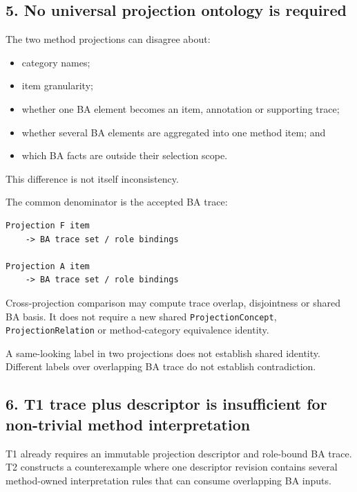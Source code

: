 \documentclass[11pt,a4paper]{article}
\providecommand{\tightlist}{\setlength{\itemsep}{0pt}\setlength{\parskip}{0pt}}
\begin{document}
\subsection{5. No universal projection ontology is
required}\label{5-no-universal-projection-ontology-is-required}

The two method projections can disagree about:

\begin{itemize}
\tightlist
\item
  category names;
\item
  item granularity;
\item
  whether one BA element becomes an item, annotation or supporting
  trace;
\item
  whether several BA elements are aggregated into one method item; and
\item
  which BA facts are outside their selection scope.
\end{itemize}

This difference is not itself inconsistency.

The common denominator is the accepted BA trace:

\begin{verbatim}
Projection F item
    -> BA trace set / role bindings

Projection A item
    -> BA trace set / role bindings
\end{verbatim}

Cross-projection comparison may compute trace overlap, disjointness or
shared BA basis. It does not require a new shared
\texttt{ProjectionConcept}, \texttt{ProjectionRelation} or
method-category equivalence identity.

A same-looking label in two projections does not establish shared
identity. Different labels over overlapping BA trace do not establish
contradiction.

\subsection{6. T1 trace plus descriptor is insufficient for non-trivial
method
interpretation}\label{6-t1-trace-plus-descriptor-is-insufficient-for-non-trivial-method-interpretation}

T1 already requires an immutable projection descriptor and role-bound BA
trace. T2 constructs a counterexample where one descriptor revision
contains several method-owned interpretation rules that can consume
overlapping BA inputs.
\end{document}
